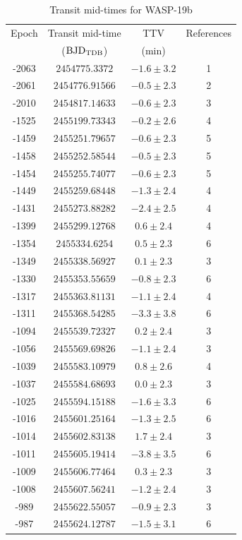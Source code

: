 \begin{longtable}{cccc}
\caption{Transit mid-times for WASP-19b}
\label{times_wasp19}
\tabularnewline
\hline \hline
Epoch & Transit mid-time & TTV & References\\
      & (${\rm BJD_{TDB}}$) & (min) &  \\
\hline
-2063 & $2454775.3372$ & $-1.6\pm3.2$ & 1\\
-2061 & $2454776.91566$ & $-0.5\pm2.3$ & 2 \\
-2010 & $2454817.14633$ & $-0.6\pm2.3$ & 3 \\
-1525 & $2455199.73343$ & $-0.2\pm2.6$& 4\\
-1459 & $2455251.79657$ & $-0.6\pm2.3$& 5 \\
-1458 & $2455252.58544$ & $-0.5\pm2.3$& 5 \\
-1454 & $2455255.74077$ & $-0.6\pm2.3$& 5 \\
-1449 & $2455259.68448$ & $-1.3\pm2.4$& 4 \\ 
-1431 & $2455273.88282$ & $-2.4\pm2.5$& 4 \\
-1399 & $2455299.12768$ & $0.6\pm2.4$& 4 \\
-1354 & $2455334.6254$ & $0.5\pm2.3$ & 6\\
-1349 & $2455338.56927$ & $0.1\pm2.3$& 3 \\ 
-1330 & $2455353.55659$ & $-0.8\pm2.3$& 6\\
-1317 & $2455363.81131$ & $-1.1\pm2.4$& 4  \\
-1311 & $2455368.54285$ & $-3.3\pm3.8$& 6 \\ 
-1094 & $2455539.72327$ & $0.2\pm2.4$ & 3 \\
-1056 & $2455569.69826$ & $-1.1\pm2.4$ & 3\\
-1039 & $2455583.10979$ & $0.8\pm2.6$ & 4 \\
-1037 & $2455584.68693$ & $0.0\pm2.3$ & 3 \\
-1025 & $2455594.15188$ &  $-1.6\pm3.3$ & 6 \\
-1016 & $2455601.25164$ & $-1.3\pm2.5$ & 6\\
-1014 & $2455602.83138$ & $1.7\pm2.4$ & 3 \\
-1011 & $2455605.19414$ & $-3.8\pm3.5$ & 6 \\
-1009 & $2455606.77464$ & $0.3\pm2.3$ & 3 \\
-1008 & $2455607.56241$ & $-1.2\pm2.4$ & 3 \\
-989 & $2455622.55057$ & $-0.9\pm2.3$ & 3 \\
-987 & $2455624.12787$ & $-1.5\pm3.1$ & 6 \\

\end{longtable}
